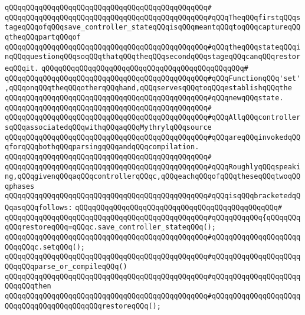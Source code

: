\verb|qQQqqQQqqQQqqQQqqQQqqQQqqQQqqQQqqQQqqQQqqQQqqQQq#|\newline
\verb|qQQqqQQqqQQqqQQqqQQqqQQqqQQqqQQqqQQqqQQqqQQqqQQq#qQQqTheqQQqfirstqQQqstageqQQqofqQQqsave_controller_stateqQQqisqQQqmeantqQQqtoqQQqcaptureqQQqtheqQQqpartqQQqof|\newline
\verb|qQQqqQQqqQQqqQQqqQQqqQQqqQQqqQQqqQQqqQQqqQQqqQQq#qQQqtheqQQqstateqQQqinqQQqquestionqQQqsoqQQqthatqQQqtheqQQqsecondqQQqstageqQQqcanqQQqrestoreqQQqit.|\newline
\verb|qQQqqQQqqQQqqQQqqQQqqQQqqQQqqQQqqQQqqQQqqQQqqQQq#|\newline
\verb|qQQqqQQqqQQqqQQqqQQqqQQqqQQqqQQqqQQqqQQqqQQqqQQq#qQQqFunctionqQQq'set',qQQqonqQQqtheqQQqotherqQQqhand,qQQqservesqQQqtoqQQqestablishqQQqthe|\newline
\verb|qQQqqQQqqQQqqQQqqQQqqQQqqQQqqQQqqQQqqQQqqQQqqQQq#qQQqnewqQQqstate.|\newline
\verb|qQQqqQQqqQQqqQQqqQQqqQQqqQQqqQQqqQQqqQQqqQQqqQQq#|\newline
\verb|qQQqqQQqqQQqqQQqqQQqqQQqqQQqqQQqqQQqqQQqqQQqqQQq#qQQqAllqQQqcontrollersqQQqassociatedqQQqwithqQQqaqQQqMythrylqQQqsource|\newline
\verb|qQQqqQQqqQQqqQQqqQQqqQQqqQQqqQQqqQQqqQQqqQQqqQQq#qQQqareqQQqinvokedqQQqforqQQqbothqQQqparsingqQQqandqQQqcompilation.|\newline
\verb|qQQqqQQqqQQqqQQqqQQqqQQqqQQqqQQqqQQqqQQqqQQqqQQq#|\newline
\verb|qQQqqQQqqQQqqQQqqQQqqQQqqQQqqQQqqQQqqQQqqQQqqQQq#qQQqRoughlyqQQqspeaking,qQQqgivenqQQqaqQQqcontrollerqQQqc,qQQqeachqQQqofqQQqtheseqQQqtwoqQQqphases|\newline
\verb|qQQqqQQqqQQqqQQqqQQqqQQqqQQqqQQqqQQqqQQqqQQqqQQq#qQQqisqQQqbracketedqQQqasqQQqfollows:|\newline
\verb|qQQqqQQqqQQqqQQqqQQqqQQqqQQqqQQqqQQqqQQqqQQqqQQq#|\newline
\verb|qQQqqQQqqQQqqQQqqQQqqQQqqQQqqQQqqQQqqQQqqQQqqQQq#qQQqqQQqqQQq{qQQqqQQqqQQqrestoreqQQq=qQQqc.save_controller_stateqQQq();|\newline
\verb|qQQqqQQqqQQqqQQqqQQqqQQqqQQqqQQqqQQqqQQqqQQqqQQq#qQQqqQQqqQQqqQQqqQQqqQQqqQQqc.setqQQq();|\newline
\verb|qQQqqQQqqQQqqQQqqQQqqQQqqQQqqQQqqQQqqQQqqQQqqQQq#qQQqqQQqqQQqqQQqqQQqqQQqqQQqparse_or_compileqQQq()|\newline
\verb|qQQqqQQqqQQqqQQqqQQqqQQqqQQqqQQqqQQqqQQqqQQqqQQq#qQQqqQQqqQQqqQQqqQQqqQQqqQQqthen|\newline
\verb|qQQqqQQqqQQqqQQqqQQqqQQqqQQqqQQqqQQqqQQqqQQqqQQq#qQQqqQQqqQQqqQQqqQQqqQQqqQQqqQQqqQQqqQQqqQQqrestoreqQQq();|\newline
